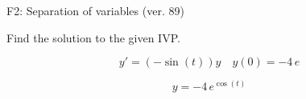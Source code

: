 \begin{exercise}
  \begin{exerciseTitle}F2: Separation of variables (ver. 89)\end{exerciseTitle}
  \begin{exerciseStatement}
    
Find the solution to the given IVP.

    
\[y'=( -\sin\left(t\right) )y\hspace{1em} y(0)= -4 \, e\]

  \end{exerciseStatement}
  \begin{exerciseAnswer}
    
\[y= -4 \, e^{\cos\left(t\right)}\]

  \end{exerciseAnswer}
\end{exercise}